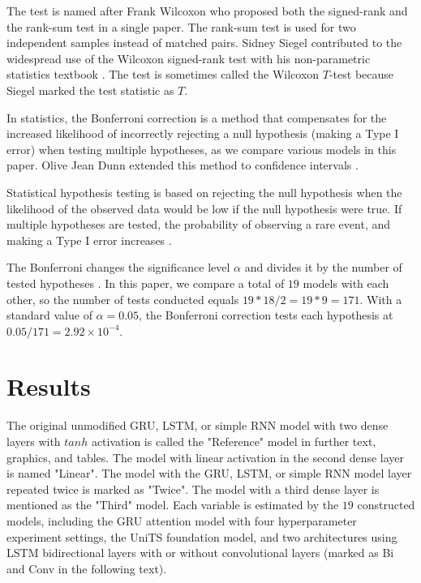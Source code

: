 \documentclass[preprint,12pt]{elsarticle}
\begin{document}
The test is named after Frank Wilcoxon \cite{wilcoxon1992individual} who proposed both the signed-rank and the rank-sum test in a single paper. The rank-sum test is used for two independent samples instead of matched pairs. Sidney Siegel contributed to the widespread use of the Wilcoxon signed-rank test with his non-parametric statistics textbook \cite{sidney1957nonparametric}. The test is sometimes called the Wilcoxon $T$-test because Siegel marked the test statistic as $T$.

In statistics, the Bonferroni correction \cite{bonferroni1936teoria} is a method that compensates for the increased likelihood of incorrectly rejecting a null hypothesis (making a Type I error) when testing multiple hypotheses, as we compare various models in this paper. Olive Jean Dunn extended this method to confidence intervals \cite{dunn1961multiple}.

Statistical hypothesis testing is based on rejecting the null hypothesis when the likelihood of the observed data would be low if the null hypothesis were true. If multiple hypotheses are tested, the probability of observing a rare event, and making a Type I error increases \cite{mittelhammer2000econometric}.

The Bonferroni changes the significance level $\alpha$ and divides it by the number of tested hypotheses \cite{rupert2012simultaneous}. In this paper, we compare a total of $19$ models with each other, so the number of tests conducted equals $19 * 18 / 2 = 19 * 9 = 171$. With a standard value of $\alpha = 0.05$, the Bonferroni correction tests each hypothesis at $0.05 / 171 = 2.92 \times 10 ^{-4}$.

\section{Results}
\label{sec:Results}

The original unmodified GRU, LSTM, or simple RNN model with two dense layers with $tanh$ activation is called the "Reference" model in further text, graphics, and tables. The model with linear activation in the second dense layer is named "Linear". The model with the GRU, LSTM, or simple RNN model layer repeated twice is marked as "Twice". The model with a third dense layer is mentioned as the "Third" model. Each variable is estimated by the $19$ constructed models, including the GRU attention model with four hyperparameter experiment settings, the UniTS foundation model, and two architectures using LSTM bidirectional layers with or without convolutional layers (marked as Bi and Conv in the following text).
\end{document}
